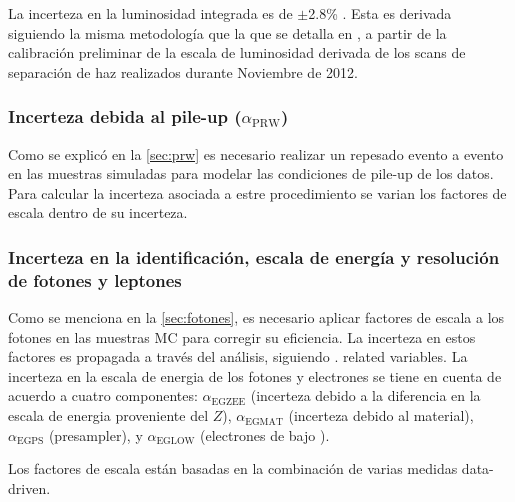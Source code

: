 La incerteza en la luminosidad integrada es de $\pm$2.8\% \cite{lumi2012}.
Esta es derivada siguiendo la misma metodología que la que se detalla en \cite{lumi2011},
a partir de la calibración preliminar  de la escala de luminosidad derivada
de los scans de separación de haz realizados durante Noviembre de 2012.


\subsubsection{Incerteza debida al pile-up ($\alpha_\mathrm{PRW}$)}

Como se explicó en la \cref{sec:prw} es necesario realizar
un repesado evento a evento en las muestras simuladas para modelar las condiciones
de pile-up de los datos. Para calcular la incerteza asociada a estre procedimiento
se varian los factores de escala dentro de su incerteza.



\subsubsection{Incerteza en la identificación, escala de energía y resolución de fotones y leptones}

Como se menciona en la \cref{sec:fotones}, es necesario aplicar factores de
escala a los fotones en las muestras MC para corregir su eficiencia. La
incerteza en estos factores es propagada a través del análisis, siguiendo
\cite{PhoEffTwiki}. %
related variables. La incerteza en la escala de energia de los fotones y
electrones se tiene en cuenta de acuerdo a cuatro
componentes\cite{EGScaleTwiki}: $\alpha_\text{EGZEE}$ (incerteza debido a la
diferencia en la escala de energia proveniente del $Z$), $\alpha_\text{EGMAT}$ (incerteza debido al material),
$\alpha_\text{EGPS}$ (presampler), y $\alpha_\text{EGLOW}$ (electrones de bajo \pt).

Los factores de escala están basadas en la combinación de varias medidas data-driven.

